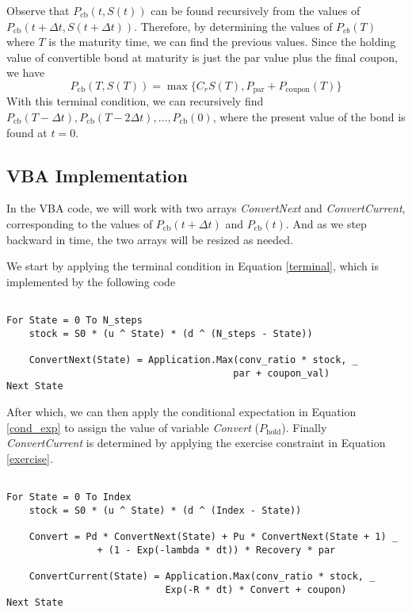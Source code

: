 \documentclass[11pt]{article}
\theoremstyle{definition}
\begin{document}
Observe that $P_\text{cb}(t,S(t))$ can be found recursively
from the values of $P_\text{cb}(t+\Delta t,S(t+\Delta t))$.
Therefore, by determining the values of $P_{cb}(T)$ 
where $T$ is the maturity time,
we can find the previous values.
Since the holding value of convertible bond at maturity
is just the par value plus the final coupon, we have
%
\begin{equation}
\label{terminal}
  P_\text{cb}(T,S(T)) = \max\Big\{C_r S(T), P_\text{par} + 
                    P_\text{coupon}(T)\Big\}
\end{equation}
%
With this terminal condition, we can recursively find
$P_\text{cb}(T-\Delta t), P_\text{cb}(T- 2 \Delta t),
\ldots, P_\text{cb}(0)$,
where the present value of the bond is found at $t=0$.








\subsection{VBA Implementation} \label{ssc:vba}

In the VBA code, we will work with two arrays \emph{ConvertNext}
and \emph{ConvertCurrent}, 
corresponding to the values of $P_\text{cb}(t+\Delta t)$
and $P_\text{cb}(t)$.
And as we step backward in time, the two arrays will be resized as needed.

We start by applying the terminal condition in Equation \eqref{terminal},
which is implemented by the following code

\begin{lstlisting}[language = VBScript, caption = VBA Code for Terminal Condition]

For State = 0 To N_steps
    stock = S0 * (u ^ State) * (d ^ (N_steps - State))

    ConvertNext(State) = Application.Max(conv_ratio * stock, _
                                        par + coupon_val)
Next State

\end{lstlisting}

After which, we can then apply the conditional expectation 
in Equation \eqref{cond_exp} 
to assign the value of variable \emph{Convert} ($P_\text{hold}$).
Finally \emph{ConvertCurrent} is determined
by applying the exercise constraint in Equation \eqref{exercise}.

\begin{lstlisting}[language = VBScript, caption = VBA Code for Terminal Condition]

For State = 0 To Index
    stock = S0 * (u ^ State) * (d ^ (Index - State))

    Convert = Pd * ConvertNext(State) + Pu * ConvertNext(State + 1) _
                + (1 - Exp(-lambda * dt)) * Recovery * par

    ConvertCurrent(State) = Application.Max(conv_ratio * stock, _
                            Exp(-R * dt) * Convert + coupon)
Next State

\end{lstlisting}
\end{document}
